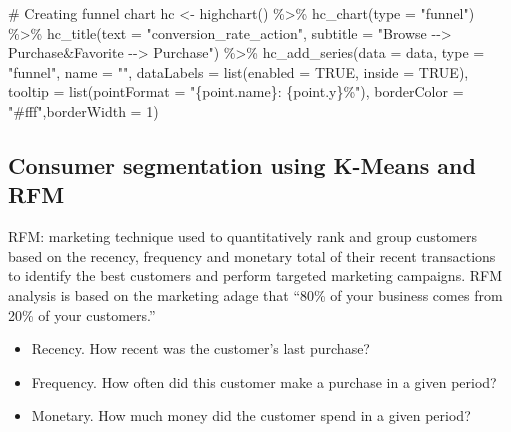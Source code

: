 \documentclass[
  11pt,
]{article}
\newenvironment{Shaded}{\begin{snugshade}}{\end{snugshade}}
\newcommand{\AttributeTok}[1]{\textcolor[rgb]{0.40,0.45,0.13}{#1}}
\newcommand{\CommentTok}[1]{\textcolor[rgb]{0.37,0.37,0.37}{#1}}
\newcommand{\ConstantTok}[1]{\textcolor[rgb]{0.56,0.35,0.01}{#1}}
\newcommand{\DecValTok}[1]{\textcolor[rgb]{0.68,0.00,0.00}{#1}}
\newcommand{\FunctionTok}[1]{\textcolor[rgb]{0.28,0.35,0.67}{#1}}
\newcommand{\NormalTok}[1]{\textcolor[rgb]{0.00,0.23,0.31}{#1}}
\newcommand{\OtherTok}[1]{\textcolor[rgb]{0.00,0.23,0.31}{#1}}
\newcommand{\SpecialCharTok}[1]{\textcolor[rgb]{0.37,0.37,0.37}{#1}}
\newcommand{\StringTok}[1]{\textcolor[rgb]{0.13,0.47,0.30}{#1}}
\providecommand{\tightlist}{%
  \setlength{\itemsep}{0pt}\setlength{\parskip}{0pt}}\usepackage{longtable,booktabs,array}
\begin{document}
\begin{Shaded}
\begin{Highlighting}[]
\CommentTok{\# Creating funnel chart}
\NormalTok{hc }\OtherTok{\textless{}{-}} \FunctionTok{highchart}\NormalTok{() }\SpecialCharTok{\%\textgreater{}\%}
  \FunctionTok{hc\_chart}\NormalTok{(}\AttributeTok{type =} \StringTok{"funnel"}\NormalTok{) }\SpecialCharTok{\%\textgreater{}\%}
  \FunctionTok{hc\_title}\NormalTok{(}\AttributeTok{text =} \StringTok{"conversion\_rate\_action"}\NormalTok{,}
           \AttributeTok{subtitle =} \StringTok{"Browse {-}{-}\textgreater{} Purchase\&Favorite {-}{-}\textgreater{} Purchase"}\NormalTok{) }\SpecialCharTok{\%\textgreater{}\%}
  \FunctionTok{hc\_add\_series}\NormalTok{(}\AttributeTok{data =}\NormalTok{ data,}
                \AttributeTok{type =} \StringTok{"funnel"}\NormalTok{,}
                \AttributeTok{name =} \StringTok{""}\NormalTok{,}
                \AttributeTok{dataLabels =} \FunctionTok{list}\NormalTok{(}\AttributeTok{enabled =} \ConstantTok{TRUE}\NormalTok{, }\AttributeTok{inside =} \ConstantTok{TRUE}\NormalTok{),}
                \AttributeTok{tooltip =} \FunctionTok{list}\NormalTok{(}\AttributeTok{pointFormat =} \StringTok{"\{point.name\}: \{point.y\}\%"}\NormalTok{),}
                \AttributeTok{borderColor =} \StringTok{"\#fff"}\NormalTok{,}\AttributeTok{borderWidth =} \DecValTok{1}\NormalTok{)}
\end{Highlighting}
\end{Shaded}

\hypertarget{consumer-segmentation-using-k-means-and-rfm}{%
\subsection{Consumer segmentation using K-Means and
RFM}\label{consumer-segmentation-using-k-means-and-rfm}}

RFM: marketing technique used to quantitatively rank and group customers
based on the recency, frequency and monetary total of their recent
transactions to identify the best customers and perform targeted
marketing campaigns. RFM analysis is based on the marketing adage that
``80\% of your business comes from 20\% of your customers.''

\begin{itemize}
\tightlist
\item
  Recency. How recent was the customer's last purchase?
\item
  Frequency. How often did this customer make a purchase in a given
  period?
\item
  Monetary. How much money did the customer spend in a given period?
\end{itemize}
\end{document}
